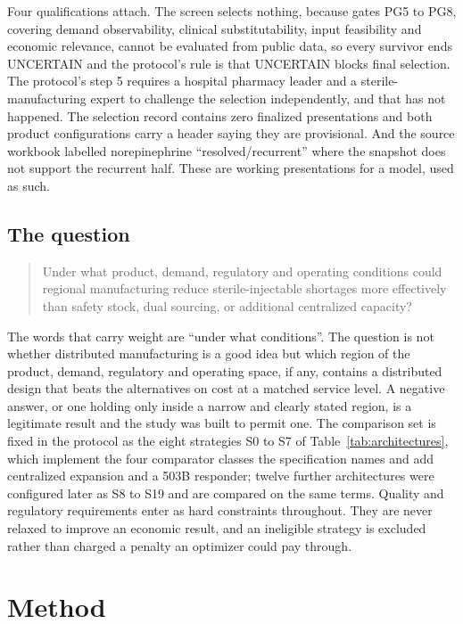Four qualifications attach. The screen selects nothing, because gates PG5 to PG8, covering
demand observability, clinical substitutability, input feasibility and economic relevance,
cannot be evaluated from public data, so every survivor ends UNCERTAIN and the protocol's rule
is that UNCERTAIN blocks final selection. The protocol's step 5 requires a hospital pharmacy
leader and a sterile-manufacturing expert to challenge the selection independently, and that
has not happened. The selection record contains zero finalized presentations and both product
configurations carry a header saying they are provisional. And the source workbook labelled
norepinephrine ``resolved/recurrent'' where the snapshot does not support the recurrent half.
These are working presentations for a model, used as such.

\subsection{The question}
\label{sec:central-question}

\begin{quote}
Under what product, demand, regulatory and operating conditions could regional manufacturing
reduce sterile-injectable shortages more effectively than safety stock, dual sourcing, or
additional centralized capacity?
\end{quote}

The words that carry weight are ``under what conditions''. The question is not whether
distributed manufacturing is a good idea but which region of the product, demand, regulatory
and operating space, if any, contains a distributed design that beats the alternatives on cost
at a matched service level. A negative answer, or one holding only inside a narrow and clearly
stated region, is a legitimate result and the study was built to permit one. The comparison set
is fixed in the protocol as the eight strategies S0 to S7 of Table~\ref{tab:architectures},
which implement the four comparator classes the specification names and add centralized
expansion and a 503B responder; twelve further architectures were configured later as S8 to S19
and are compared on the same terms. Quality and regulatory requirements enter as hard
constraints throughout. They are never relaxed to improve an economic result, and an ineligible
strategy is excluded rather than charged a penalty an optimizer could pay through.

\section{Method}
\label{sec:method}

